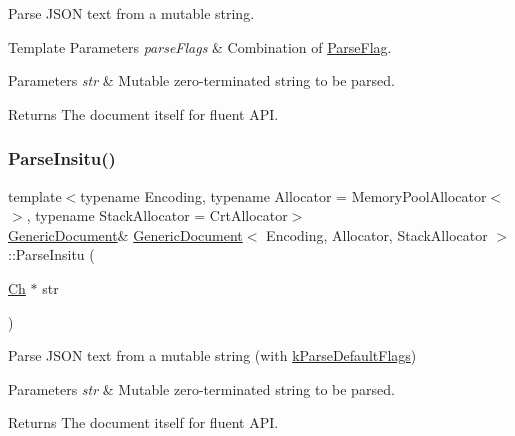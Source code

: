 Parse J\+S\+ON text from a mutable string. 


\begin{DoxyTemplParams}{Template Parameters}
{\em parse\+Flags} & Combination of \hyperlink{a00563_ab7be7dabe6ffcba60fad441505583450}{Parse\+Flag}. \\
\hline
\end{DoxyTemplParams}

\begin{DoxyParams}{Parameters}
{\em str} & Mutable zero-\/terminated string to be parsed. \\
\hline
\end{DoxyParams}
\begin{DoxyReturn}{Returns}
The document itself for fluent A\+PI. 
\end{DoxyReturn}
\mbox{\label{a01996_a81922881357539d5482d31aea14b5664}} 
\subsubsection{\texorpdfstring{Parse\+Insitu()}{ParseInsitu()}\hspace{0.1cm}{\footnotesize\ttfamily [2/2]}}
{\footnotesize\ttfamily template$<$typename Encoding, typename Allocator = Memory\+Pool\+Allocator$<$$>$, typename Stack\+Allocator = Crt\+Allocator$>$ \\
\hyperlink{a01996}{Generic\+Document}\& \hyperlink{a01996}{Generic\+Document}$<$ Encoding, Allocator, Stack\+Allocator $>$\+::Parse\+Insitu (\begin{DoxyParamCaption}\item[{\hyperlink{a01992_ade0e0ce64ccd5d852da57a35e720bafb}{Ch} $\ast$}]{str }\end{DoxyParamCaption})\hspace{0.3cm}{\ttfamily [inline]}}



Parse J\+S\+ON text from a mutable string (with \hyperlink{a00563_ab7be7dabe6ffcba60fad441505583450a9104b0946d648e9467cb7a967401ec80}{k\+Parse\+Default\+Flags}) 


\begin{DoxyParams}{Parameters}
{\em str} & Mutable zero-\/terminated string to be parsed. \\
\hline
\end{DoxyParams}
\begin{DoxyReturn}{Returns}
The document itself for fluent A\+PI. 
\end{DoxyReturn}
\mbox{\label{a01996_afe94c0abc83a20f2d7dc1ba7677e6238}} 
